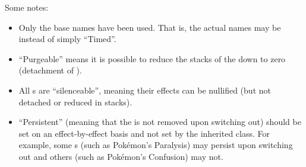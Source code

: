 
\vspace*{1em}

Some notes:

\begin{itemize}
	\item{Only the base names have been used. That is, the actual names may be\\  instead of simply ``Timed''.}
	\item{``Purgeable'' means it is possible to reduce the stacks of the  down to zero (detachment of ).}
	\item{All s are ``silenceable'', meaning their effects can be nullified (but not detached or reduced in stacks).}
	\item{``Persistent'' (meaning that the  is not removed upon switching out) should be set on an effect-by-effect basis and not set by the inherited class. For example, some s (such as Pok\'{e}mon's Paralysis) may persist upon switching out and others (such as Pok\'{e}mon's Confusion) may not.}
\end{itemize}


\postamble{}